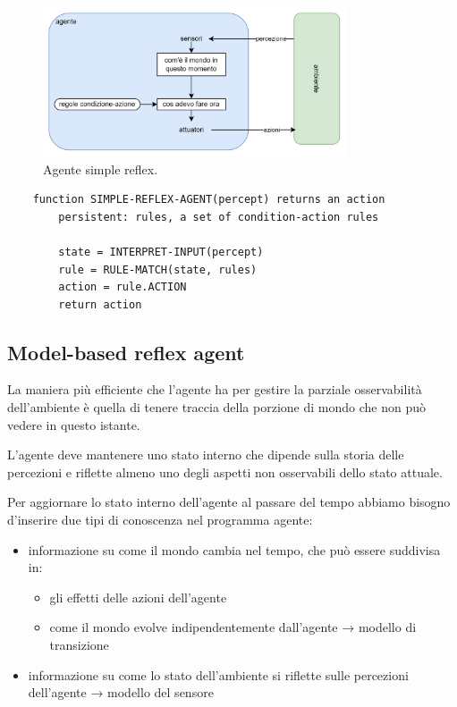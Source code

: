 \begin{figure}[H]
	\centering
	\includegraphics[width=0.8\textwidth]{capitoli/agenti-intelligenti/imgs/simple-reflex.png}
	\caption{Agente simple reflex.}
\end{figure}

\begin{lstlisting}
	function SIMPLE-REFLEX-AGENT(percept) returns an action
		persistent: rules, a set of condition-action rules
		
		state = INTERPRET-INPUT(percept)
		rule = RULE-MATCH(state, rules)
		action = rule.ACTION
		return action
\end{lstlisting}

\subsection{Model-based reflex agent}

La maniera più efficiente che l'agente ha per gestire la parziale osservabilità dell'ambiente è quella di tenere traccia della porzione di mondo che non può vedere in questo istante.

L'agente deve mantenere uno stato interno che dipende sulla storia delle percezioni e riflette almeno uno degli aspetti non osservabili dello stato attuale.

Per aggiornare lo stato interno dell'agente al passare del tempo abbiamo bisogno d'inserire due tipi di conoscenza nel programma agente:

\begin{itemize}
	\item informazione su come il mondo cambia nel tempo, che può essere suddivisa in:
	\begin{itemize}
		\item gli effetti delle azioni dell'agente 
		\item come il mondo evolve indipendentemente dall'agente → modello di transizione
	\end{itemize}
	\item informazione su come lo stato dell'ambiente si riflette sulle percezioni dell'agente → modello del sensore
\end{itemize}


